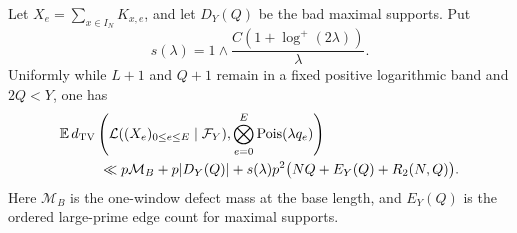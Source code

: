 \begin{samepage}
\begin{theorem}\label{supp:thm:aggregated}
Let $X_e=\sum_{x\in I_N}K_{x,e}$, and let $D_Y(Q)$ be the bad maximal
supports. Put
\[
 s(\lambda)=1\wedge
          \frac{C(1+\log^+(2\lambda))}{\lambda}.
\]
Uniformly while $L+1$ and $Q+1$ remain in a fixed positive logarithmic
band and $2Q<Y$, one has
\begin{align}\label{supp:eq:aggregate-finite}
 &\mathbb E\,d_{\mathrm{TV}}\left(\mathcal L((X_e)_{0\le e\le E}\mid\mathcal F_Y),
                  \bigotimes_{e=0}^E\operatorname{Pois}(\lambda q_e)\right)\notag\\
 &\hspace{1cm}\ll p\mathcal M_B+p|D_Y(Q)|
    +s(\lambda)p^2\bigl(NQ+E_Y(Q)+R_2(N,Q)\bigr).
\end{align}
Here $\mathcal M_B$ is the one-window defect mass at the base length,
and $E_Y(Q)$ is the ordered large-prime edge count for maximal supports.
\end{theorem}
\end{samepage}
